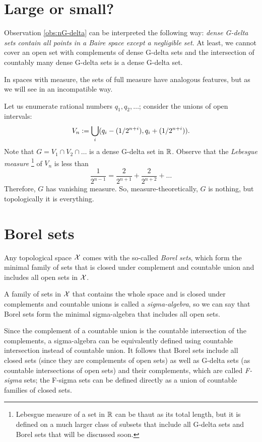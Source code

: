 \section{Large or small?}


Observation \ref{obs:nG-delta} can be interpreted the following way:
\textit{dense G-delta sets contain all points in a Baire space except a negligible set}.
At least, we cannot cover an open set with complements of dense G-delta sets
and the intersection of countably many dense G-delta sets is a dense G-delta set.

In spaces with measure, the sets of full measure have analogous features, but as we will see in an incompatible way.

Let us enumerate rational numbers $q_1,q_2,\ldots$; consider the unions of open intervals:
\[V_n\mathrel{:=} \bigcup_i (q_i-(1/2^{n+i}),q_i+(1/2^{n+i})).\]
Note that $G=V_1\cap V_2\cap \ldots$ is a dense G-delta set in $\mathbb{R}$.
Observe that the \emph{Lebesgue measure}%
\footnote{Lebesgue measure of a set in $\mathbb{R}$ can be thaut as its total length, but it is defined on a much larger class of subsets that include all G-delta sets and Borel sets that will be discussed soon.}
of $V_n$ is less than
\[\frac1{2^{n-1}}=\frac{2}{2^{n+1}}+\frac{2}{2^{n+2}}+\ldots\]
Therefore, $G$ has vanishing measure.
So, measure-theoretically, $G$ is nothing, but topologically it is everything.

\section{Borel sets}

Any topological space $\mathcal{X}$ comes with the so-called \emph{Borel sets}, which form the minimal family of sets that is closed under complement and countable union and includes all open sets in $\mathcal{X}$.

A family of sets in $\mathcal{X}$ that contains the whole space and is closed under complements and countable unions is called a \emph{sigma-algebra}, so we can say that Borel sets form the minimal sigma-algebra that includes all open sets.

Since the complement of a countable union is the countable intersection of the complements,
a sigma-algebra can be equivalently defined using countable intersection instead of countable union.
It follows that Borel sets include all closed sets (since they are complements of open sets) as well as G-delta sets (as countable intersections of open sets) and their complements, which are called \emph{F-sigma} sets;
the F-sigma sets can be defined directly as a union of countable families of closed sets.

